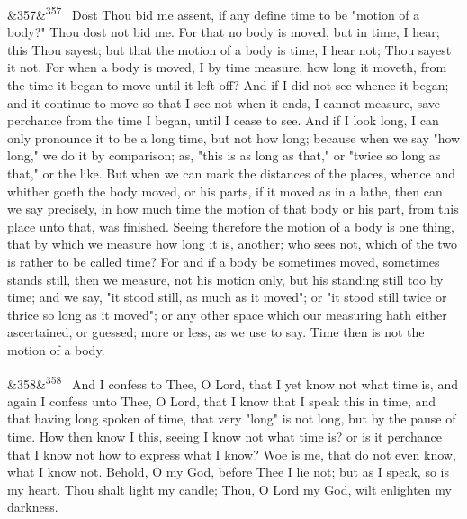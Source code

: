 \documentclass[12pt]{article}
\newcommand{\para}[1][]{\par\noindent\ifx&#1&\else\textsuperscript{\footnotesize #1}~\fi}
\begin{document}
\para[357] Dost Thou bid me assent, if any define time to be "motion of a body?" Thou dost not bid me. For that no body is moved, but in time, I hear; this Thou sayest; but that the motion of a body is time, I hear not; Thou sayest it not. For when a body is moved, I by time measure, how long it moveth, from the time it began to move until it left off? And if I did not see whence it began; and it continue to move so that I see not when it ends, I cannot measure, save perchance from the time I began, until I cease to see. And if I look long, I can only pronounce it to be a long time, but not how long; because when we say "how long," we do it by comparison; as, "this is as long as that," or "twice so long as that," or the like. But when we can mark the distances of the places, whence and whither goeth the body moved, or his parts, if it moved as in a lathe, then can we say precisely, in how much time the motion of that body or his part, from this place unto that, was finished. Seeing therefore the motion of a body is one thing, that by which we measure how long it is, another; who sees not, which of the two is rather to be called time? For and if a body be sometimes moved, sometimes stands still, then we measure, not his motion only, but his standing still too by time; and we say, "it stood still, as much as it moved"; or "it stood still twice or thrice so long as it moved"; or any other space which our measuring hath either ascertained, or guessed; more or less, as we use to say. Time then is not the motion of a body.

\para[358] And I confess to Thee, O Lord, that I yet know not what time is, and again I confess unto Thee, O Lord, that I know that I speak this in time, and that having long spoken of time, that very "long" is not long, but by the pause of time. How then know I this, seeing I know not what time is? or is it perchance that I know not how to express what I know? Woe is me, that do not even know, what I know not. Behold, O my God, before Thee I lie not; but as I speak, so is my heart. Thou shalt light my candle; Thou, O Lord my God, wilt enlighten my darkness.
\end{document}
